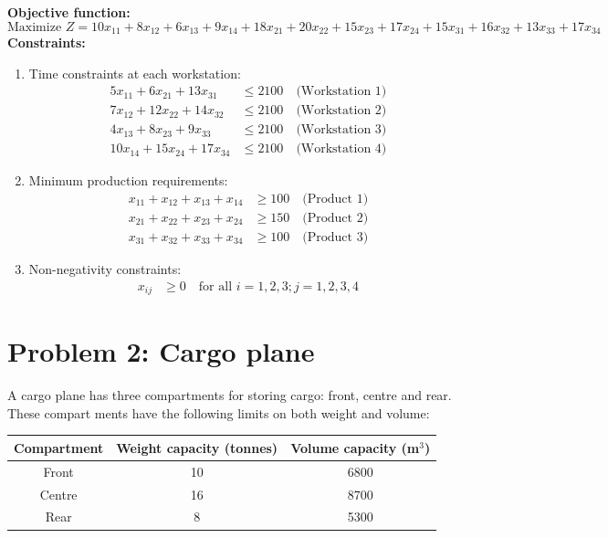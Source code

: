 \documentclass[a4paper,10pt]{article}
\begin{document}
\textbf{Objective function:}
\begin{equation*}
    \text{Maximize } Z = 10x_{11} + 8x_{12} + 6x_{13} + 9x_{14} + 18x_{21} + 20x_{22} + 15x_{23} + 17x_{24} + 15x_{31} + 16x_{32} + 13x_{33} + 17x_{34} 
\end{equation*}
\textbf{Constraints:}
\begin{enumerate}
    \item Time constraints at each workstation:
    \begin{align*}
        5x_{11} + 6x_{21} + 13x_{31} &\leq 2100 \quad \text{(Workstation 1)} \\
        7x_{12} + 12x_{22} + 14x_{32} &\leq 2100 \quad \text{(Workstation 2)} \\
        4x_{13} + 8x_{23} + 9x_{33} &\leq 2100 \quad \text{(Workstation 3)} \\
        10x_{14} + 15x_{24} + 17x_{34} &\leq 2100 \quad \text{(Workstation 4)}
    \end{align*}
    
    \item Minimum production requirements:
    \begin{align*}
        x_{11} + x_{12} + x_{13} + x_{14} &\geq 100 \quad \text{(Product 1)} \\
        x_{21} + x_{22} + x_{23} + x_{24} &\geq 150 \quad \text{(Product 2)} \\
        x_{31} + x_{32} + x_{33} + x_{34} &\geq 100 \quad \text{(Product 3)}
    \end{align*}
    
    \item Non-negativity constraints:
    \begin{align*}
        x_{ij} &\geq 0 \quad \text{for all } i=1,2,3; j=1,2,3,4
    \end{align*}
\end{enumerate}

\newpage
\section*{Problem 2: Cargo plane}

A cargo plane has three compartments for storing cargo: front, centre and rear. These compart
ments have the following limits on both weight and volume:

\begin{table}[H]
\centering
\begin{tabular}{|c|c|c|}
\hline
Compartment & Weight capacity (tonnes) & Volume capacity (m$^3$) \\
\hline
Front & 10 & 6800 \\
\hline
Centre & 16 & 8700 \\
\hline
Rear & 8 & 5300 \\
\hline
\end{tabular}
\end{table}
\end{document}
